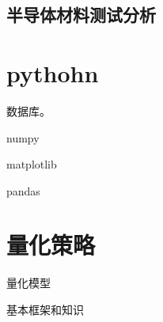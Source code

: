 \subsection{半导体材料测试分析}


\section{pythohn}
数据库。

numpy

matplotlib

pandas


\section{量化策略}
量化模型

基本框架和知识




%
